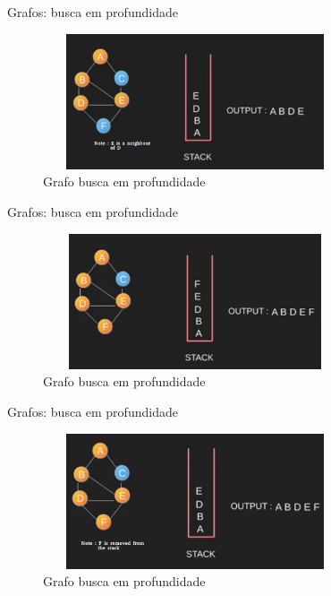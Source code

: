 \begin{frame}
	\begin{block}{Grafos: busca em profundidade}
		\begin{figure}[!htb]
			\centering	  
			\includegraphics[height=4cm, width = 9cm]{./pic/dfs5.png}
			\caption{Grafo busca em profundidade \cite{GEEKS_2018}}
		\end{figure}
	\end{block}
\end{frame}

\begin{frame}
	\begin{block}{Grafos: busca em profundidade}
		\begin{figure}[!htb]
			\centering	  
			\includegraphics[height=4cm, width = 9cm]{./pic/dfs6.png}
			\caption{Grafo busca em profundidade \cite{GEEKS_2018}}
		\end{figure}
	\end{block}
\end{frame}

\begin{frame}
	\begin{block}{Grafos: busca em profundidade}
		\begin{figure}[!htb]
			\centering	  
			\includegraphics[height=4cm, width = 9cm]{./pic/dfs7.png}
			\caption{Grafo busca em profundidade \cite{GEEKS_2018}}
		\end{figure}
	\end{block}
\end{frame}

